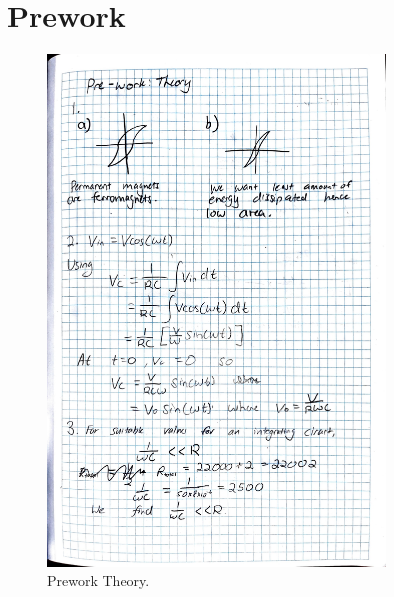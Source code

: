 \documentclass{article}
\begin{document}
\section{Prework}
\begin{figure}[H]
    \centering
    \includegraphics[width=0.8\textwidth]{prework1.jpg}
    \caption{Prework Theory.}
\end{figure}
\end{document}
